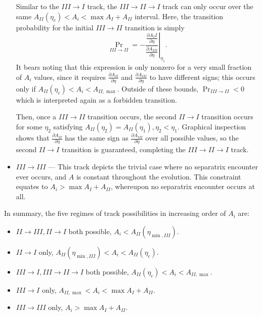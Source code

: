 \documentclass[
        fleqn,
        usenatbib,
    ]{mnras}
\newcommand*{\pd}[2]{\frac{\partial#1}{\partial#2}}
\newcommand*{\at}[1]{\left.#1\right|}
\newcommand*{\p}[1]{\left(#1\right)}
\begin{document}
\begin{itemize}
        Similar to the $III \to I$ track, the $III \to II \to I$ track can only
        occur over the same $A_{II}(\eta_c) < A_i < \max A_I + A_{II}$ interval.
        Here, the transition probability for the initial $III \to II$ transition
        is simply
        \begin{equation}
            \Pr_{III \to II} = -\at{\frac{\pd{A_II}{\eta}}{\pd{A_{III}}{\eta}}}
                _{\eta_1}.
        \end{equation}
        It bears noting that this expression is only nonzero for a very small
        fraction of $A_i$ values, since it requires $\pd{A_{II}}{\eta}$ and
        $\pd{A_{III}}{\eta}$ to have different signs; this occurs only if
        $A_{II}\p{\eta_c} < A_i < A_{II, \max}$. Outside of these bounds,
        $\Pr_{III \to II} < 0$ which is interpreted again as a forbidden
        transition.

        Then, once a $III \to II$ transition occurs, the second $II \to I$
        transition occurs for some $\eta_2$ satisfying $A_{II}(\eta_2) =
        A_{II}(\eta_1), \eta_2 < \eta_1$. Graphical inspection shows that
        $\pd{A_{II}}{\eta}$ has the same sign as $\pd{A_{III}}{\eta}$ over all
        possible values, so the second $II \to I$ transition is guaranteed,
        completing the $III \to II \to I$ track.

    \item $III \to III$ --- This track depicts the trivial case where no
        separatrix encounter ever occurs, and $A$ is constant throughout the
        evolution. This constraint equates to $A_i > \max A_I + A_{II}$,
        whereupon no separatrix encounter occurs at all.
\end{itemize}
In summary, the five regimes of track possibilities in increasing order of $A_i$
are:
\begin{itemize}
    \item $II \to III, II \to I$ both possible, $A_i < A_{II}\p{\eta_{\min,
        III}}$.

    \item $II \to I$ only, $A_{II}\p{\eta_{\min, III}} < A_i < A_{II}(\eta_c)$.

    \item $III \to I, III \to II \to I$ both possible, $A_{II}(\eta_c) < A_i <
        A_{II, \max}$.

    \item $III \to I$ only, $A_{II, \max} < A_i < \max A_I + A_{II}$.

    \item $III \to III$ only, $A_i > \max A_I + A_{II}$.
\end{itemize}
\end{document}
